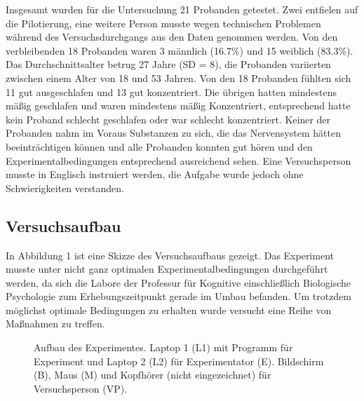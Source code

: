 \documentclass[doc,a4paper,12pt]{apa6}
\begin{document}
Insgesamt wurden für die Untersuchung 21 Probanden getestet. Zwei entfielen auf die Pilotierung, eine weitere Person musste wegen technischen Problemen während des Versuchsdurchgangs aus den Daten genommen werden. Von den verbleibenden 18 Probanden waren 3 männlich (16.7\%) und 15 weiblich (83.3\%). Das Durchschnittsalter betrug 27 Jahre (SD = 8), die Probanden variierten zwischen einem Alter von 18 und 53 Jahren. Von den 18 Probanden fühlten sich 11 gut ausgeschlafen und 13 gut konzentriert. Die übrigen hatten mindestens mäßig geschlafen und waren mindestens mäßig Konzentriert, entsprechend hatte kein Proband schlecht geschlafen oder war schlecht konzentriert. Keiner der Probanden nahm im Voraus Substanzen zu sich, die das Nervensystem hätten beeinträchtigen können und alle Probanden konnten gut hören und den Experimentalbedingungen entsprechend ausreichend sehen. Eine Versuchsperson musste in Englisch instruiert werden, die Aufgabe wurde jedoch ohne Schwierigkeiten verstanden.

\subsection{Versuchsaufbau}

In Abbildung 1 ist eine Skizze des Versuchsaufbaus gezeigt. Das Experiment musste unter nicht ganz optimalen Experimentalbedingungen durchgeführt werden, da sich die Labore der Professur für Kognitive einschließlich Biologische Psychologie zum Erhebungszeitpunkt gerade im Umbau befanden. Um trotzdem möglichst optimale Bedingungen zu erhalten wurde versucht eine Reihe von Maßnahmen zu treffen.

\begin{figure}
  \centering
  \begin{minipage}{.55\textwidth}
    \setlength{\fboxsep}{.05\textwidth}
    \vspace{10pt}
    \caption{Aufbau des Experimentes. Laptop 1 (L1) mit Programm für Experiment und Laptop 2 (L2) für Experimentator (E). Bildschirm (B), Maus (M) und Kopfhörer (nicht eingezeichnet) für Versuchsperson (VP).}
  \end{minipage}
  \vspace{-15pt}
\end{figure}
\end{document}
